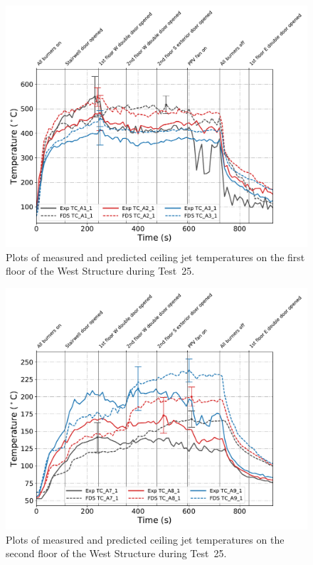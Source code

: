 \begin{figure}[!h]
	\centering
	\includegraphics[width=\columnwidth]{Figures/Plots/Validation/Temperature/Test_25_cjet_1}
	\caption[Plots of measured and predicted ceiling jet temperatures on the first floor during Test~25.]{Plots of measured and predicted ceiling jet temperatures on the first floor of the West Structure during Test~25.}
	\label{fig:cjet1_data_Test25}
\end{figure}

\begin{figure}[!h]
	\centering
	\includegraphics[width=\columnwidth]{Figures/Plots/Validation/Temperature/Test_25_cjet_2}
	\caption[Plots of measured and predicted ceiling jet temperatures on the second floor during Test~25.]{Plots of measured and predicted ceiling jet temperatures on the second floor of the West Structure during Test~25.}
	\label{fig:cjet2_data_Test25}
\end{figure}

